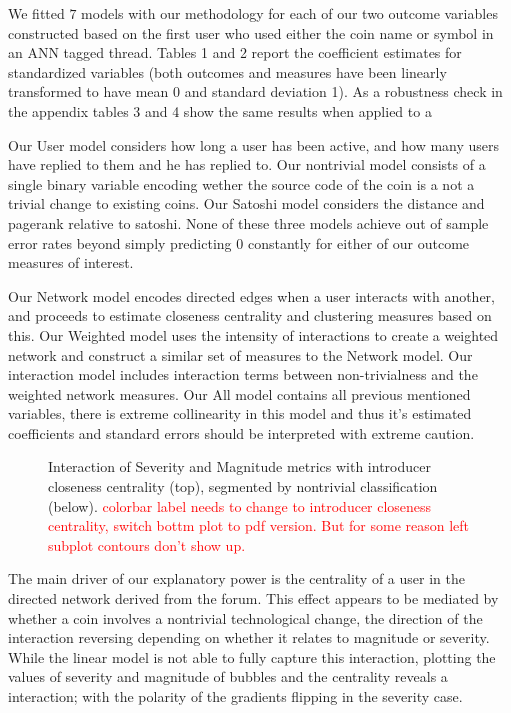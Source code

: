 We fitted $7$ models with our methodology for each of our two outcome variables constructed based on the first user who used either the coin name or symbol in an ANN tagged thread.
Tables 1 and 2 report the coefficient estimates for standardized variables (both outcomes and measures have been linearly transformed to have mean 0 and standard deviation 1).
As a robustness check in the appendix tables 3 and 4 show the same results when applied to a 

Our User model considers how long a user has been active, and how many users have replied to them and he has replied to. 
Our nontrivial model consists of a single binary variable encoding wether the source code of the coin is a not a trivial change to existing coins. 
Our Satoshi model considers the distance and pagerank relative to satoshi.
None  of these three models achieve out of sample error rates beyond simply predicting $0$ constantly for either of our outcome measures of interest.


Our Network model encodes directed edges when a user interacts with another, and proceeds to estimate closeness centrality and clustering measures based on this. 
Our Weighted model uses the intensity of interactions to create a weighted network and construct a similar set of measures to the Network model.
Our interaction model includes interaction terms between non-trivialness and the weighted network measures.
Our All model contains all previous mentioned variables, there is extreme collinearity in this model and thus it's estimated coefficients and standard errors should be interpreted with extreme caution. 


\begin{figure}[h]
\centering
\begin{subfigure}
{\texttt{[image: centrality\_volume\_severity.pdf]}}
\end{subfigure}
\begin{subfigure}
{\texttt{[image: centrality\_volume\_severity\_nontrivial]}}
\end{subfigure}
\caption{Interaction of Severity and Magnitude metrics with introducer closeness centrality (top), segmented by nontrivial classification (below). \textcolor{red}{colorbar label needs to change to introducer closeness centrality, switch bottm plot to pdf version. But for some reason left subplot contours don't show up.}}
\label{centrality_volume_severity}
\end{figure}

The main driver of our explanatory power is the centrality of a user in the directed network derived from the forum. 
This effect appears to be mediated by whether a coin involves a nontrivial technological change, the direction of the interaction reversing depending on whether it relates to magnitude or severity.
While the linear model is not able to fully capture this interaction, plotting the values of severity and magnitude of bubbles and the centrality reveals a interaction; with the polarity of the gradients flipping in the severity case.

